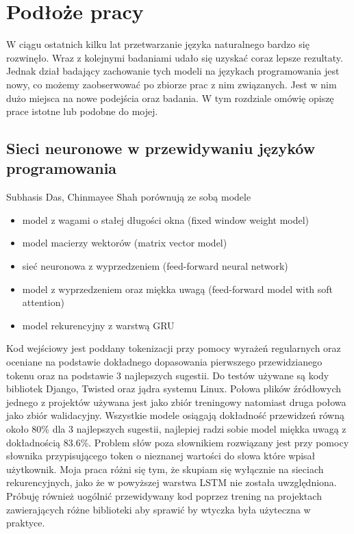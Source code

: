 \newpage %
\section{Podłoże pracy}
W ciągu ostatnich kilku lat przetwarzanie języka naturalnego bardzo się rozwinęło. Wraz z kolejnymi 
badaniami udało się uzyskać coraz lepsze rezultaty. Jednak dział badający zachowanie tych modeli 
na językach programowania jest nowy, co możemy zaobserwować po zbiorze prac \cite{ml4code}
z nim związanych. Jest w nim dużo miejsca na nowe podejścia oraz badania. W tym rozdziale omówię 
opiszę prace istotne lub podobne do mojej.  


\subsection{Sieci neuronowe w przewidywaniu języków programowania}
Subhasis Das, Chinmayee Shah \cite{contextual_code_completion} porównują ze sobą modele
\begin{itemize}
    \item model z wagami o stałej długości okna (fixed window weight model)
    \item model macierzy wektorów (matrix vector model)
    \item sieć neuronowa z wyprzedzeniem (feed-forward neural network)
    \item model z wyprzedzeniem oraz miękka uwagą (feed-forward model with soft attention)
    \item model rekurencyjny z warstwą GRU
\end{itemize}
Kod wejściowy jest poddany tokenizacji przy pomocy wyrażeń regularnych oraz oceniane na podstawie dokładnego 
dopasowania pierwszego przewidzianego tokenu oraz na podstawie 3 najlepszych sugestii. Do testów 
używane są kody bibliotek Django, Twisted oraz jądra systemu Linux. Połowa plików źródłowych jednego z 
projektów używana jest jako zbiór treningowy natomiast druga połowa jako zbiór walidacyjny. Wszystkie modele
osiągają dokładność przewidzeń równą około 80\% dla 3 najlepszych sugestii, najlepiej radzi sobie model miękka uwagą
z dokładnością 83.6\%. Problem słów poza słownikiem rozwiązany jest przy pomocy słownika przypisującego 
token o nieznanej wartości do słowa które wpisał użytkownik. Moja praca różni się tym, że skupiam się 
wyłącznie na sieciach rekurencyjnych, jako że w powyższej warstwa LSTM nie została uwzględniona. Próbuję 
również uogólnić przewidywany kod poprzez trening na projektach zawierających różne biblioteki aby sprawić
by wtyczka była użyteczna w praktyce. \\

